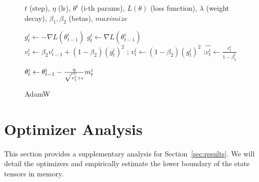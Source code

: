 \begin{figure}[t]
\begin{algorithm}[H]
    \caption{AdamW}\label{algorithm:adamw}
    \begin{algorithmic}[1]
        \Require $t$ (step), $\eta$ (lr), $\theta^i$ (i-th params), $L(\theta)$ (loss function), $\lambda$ (weight decay), $\beta_1, \beta_2$ (betas),  $maximize$ 
        
        \Repeat
                \State $g^i_t \gets -\nabla L(\theta^i_{t-1})$
            \Else
                \State $g^i_t \gets \nabla L(\theta^i_{t-1})$
            \EndIf
            \State {}
                \State $v^i_t \gets \beta_2 v^i_{t-1} + (1-\beta_2) (g^i_t)^2 $
            \Else
                \State {}; $v^i_t \gets (1-\beta_2) (g^i_t)^2 $
            \EndIf
            ;{$\hat{v^i_t} \gets \frac{v^i_t}{1-\beta_2^t}$}
            \State
            
            \State {}
            \State
            \State $\theta^i_t \gets \theta^i_{t-1} - \text{$ \frac{\eta}{\sqrt{\hat{v^i_t}} + \epsilon}m^i_t $} $

        \EndFor
    \end{algorithmic}
\end{algorithm}
\end{figure}

\section{Optimizer Analysis} \label{sec:sup:optimizer_breakdown}
This section provides a supplementary analysis for Section~\ref{sec:results}. We will detail the optimizers and empirically estimate the lower boundary of the state tensors in memory.

